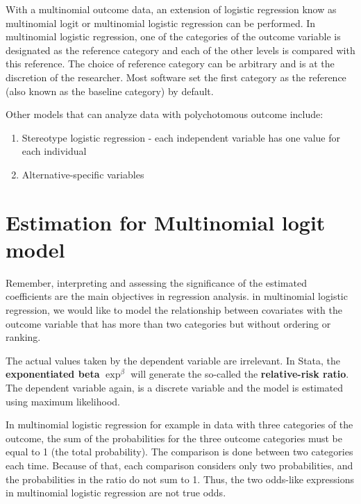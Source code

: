 \documentclass[
  10pt,
]{krantz}
\providecommand{\tightlist}{%
  \setlength{\itemsep}{0pt}\setlength{\parskip}{0pt}}
\begin{document}
With a multinomial outcome data, an extension of logistic regression know as multinomial logit or multinomial logistic regression can be performed. In multinomial logistic regression, one of the categories of the outcome variable is designated as the reference category and each of the other levels is compared with this reference. The choice of reference category can be arbitrary and is at the discretion of the researcher. Most software set the first category as the reference (also known as the baseline category) by default.

Other models that can analyze data with polychotomous outcome include:

\begin{enumerate}
\def\labelenumi{\arabic{enumi}.}
\tightlist
\item
  Stereotype logistic regression - each independent variable has one value for each individual
\item
  Alternative-specific variables
\end{enumerate}

\hypertarget{estimation-for-multinomial-logit-model}{%
\section{\texorpdfstring{Estimation for Multinomial logit model}{Estimation for Multinomial logit model}}\label{estimation-for-multinomial-logit-model}}

Remember, interpreting and assessing the significance of the estimated coefficients are the main objectives in regression analysis. in multinomial logistic regression, we would like to model the relationship between covariates with the outcome variable that has more than two categories but without ordering or ranking.

The actual values taken by the dependent variable are irrelevant. In Stata, the \textbf{exponentiated beta} \(\exp^{\beta}\) will generate the so-called the \textbf{relative-risk ratio}. The dependent variable again, is a discrete variable and the model is estimated using maximum likelihood.

In multinomial logistic regression for example in data with three categories of the outcome, the sum of the probabilities for the three outcome categories must be equal to 1 (the total probability). The comparison is done between two categories each time. Because of that, each comparison considers only two probabilities, and the probabilities in the ratio do not sum to 1. Thus, the two odds-like expressions in multinomial logistic regression are not true odds.
\end{document}

